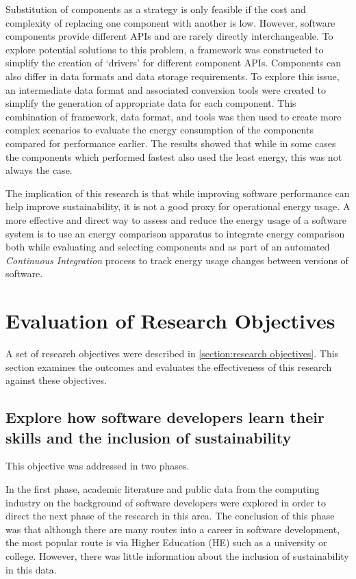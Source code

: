 Substitution of components as a strategy is only feasible if the cost and complexity of replacing one component with another is low. However, software components provide different APIs and are rarely directly interchangeable. To explore potential solutions to this problem, a framework was constructed to simplify the creation of `drivers' for different component APIs. Components can also differ in data formats and data storage requirements. To explore this issue, an intermediate data format and associated conversion tools were created to simplify the generation of appropriate data for each component. This combination of framework, data format, and tools was then used to create more complex scenarios to evaluate the energy consumption of the components compared for performance earlier. The results showed that while in some cases the components which performed fastest also used the least energy, this was not always the case.

The implication of this research is that while improving software performance can help improve sustainability, it is not a good proxy for operational energy usage. A more effective and direct way to assess and reduce the energy usage of a software system is to use an energy comparison apparatus to integrate energy comparison both while evaluating and selecting components and as part of an automated \emph{Continuous Integration} process to track energy usage changes between versions of software.

\section{Evaluation of Research Objectives}

A set of research objectives were described in \autoref{section:research objectives}. This section examines the outcomes and evaluates the effectiveness of this research against these objectives.

\subsection{Explore how software developers learn their skills and the inclusion of sustainability}

This objective was addressed in two phases.

In the first phase, academic literature and public data from the computing industry on the background of software developers were explored in order to direct the next phase of the research in this area. The conclusion of this phase was that although there are many routes into a career in software development, the most popular route is via Higher Education (HE) such as a university or college. However, there was little information about the inclusion of sustainability in this data. 


